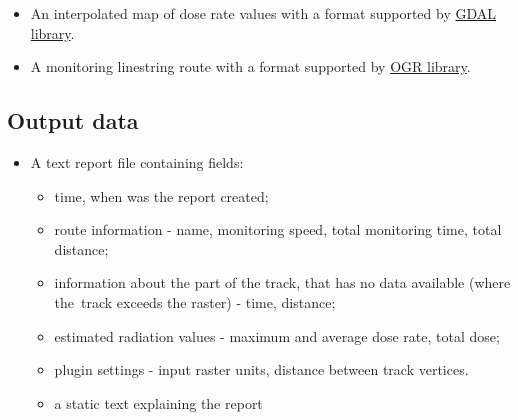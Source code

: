 \begin{itemize}

\item
  An interpolated map of dose rate values with a format supported by
  \href{http://www.gdal.org/formats_list.html}{GDAL library}.
\item
  A monitoring linestring route with a format supported by
  \href{http://www.gdal.org/ogr_formats.html}{OGR library}.
\end{itemize}

\subsection{Output data}\label{output-data}

\begin{itemize}

\item
  A text report file containing fields:

  \begin{itemize}
  \item
    time, when was the report created;
  \item
    route information - name, monitoring speed, total monitoring time,
    total distance;
  \item
    information about the part of the track, that has no data available
    (where the~track exceeds the raster) - time, distance;
  \item
    estimated radiation values - maximum and average dose rate, total
    dose;
  \item
    plugin settings - input raster units, distance between track
    vertices.
  \item
    a static text explaining the report
  \end{itemize}
\end{itemize}

